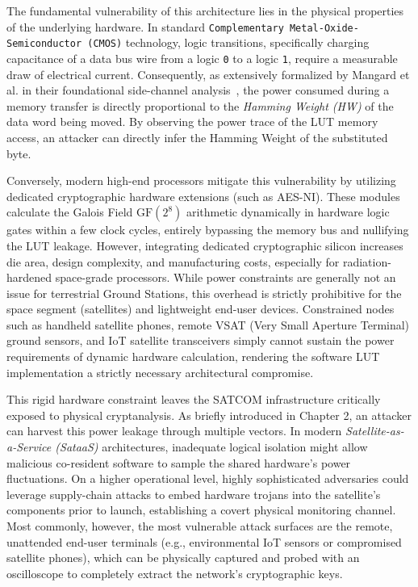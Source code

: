 \documentclass[11pt,a4paper]{report}
\begin{document}
The fundamental vulnerability of this architecture lies in the physical properties of the underlying hardware. 
In standard \texttt{Complementary Metal-Oxide-Semiconductor (CMOS)} technology, logic transitions, specifically charging capacitance of a data bus wire from a logic \texttt{0} to a logic \texttt{1}, require a measurable draw of electrical current. 
Consequently, as extensively formalized by Mangard et al. in their foundational side-channel analysis~\cite{HW_PROPOZIONALE_CONSUMO}, the power consumed during a memory transfer is directly proportional to the \textit{Hamming Weight (HW)} of the data word being moved. 
By observing the power trace of the LUT memory access, an attacker can directly infer the Hamming Weight of the substituted byte.

Conversely, modern high-end processors mitigate this vulnerability by utilizing dedicated cryptographic hardware extensions (such as AES-NI). 
These modules calculate the Galois Field $\mathrm{GF}(2^8)$ arithmetic dynamically in hardware logic gates within a few clock cycles, entirely bypassing the memory bus and nullifying the LUT leakage. 
However, integrating dedicated cryptographic silicon increases die area, design complexity, and manufacturing costs, especially for radiation-hardened space-grade processors.
While power constraints are generally not an issue for terrestrial Ground Stations, this overhead is strictly prohibitive for the space segment (satellites) and lightweight end-user devices. 
Constrained nodes such as handheld satellite phones, remote VSAT (Very Small Aperture Terminal) ground sensors, and IoT satellite transceivers simply cannot sustain the power requirements of dynamic hardware calculation, 
rendering the software LUT implementation a strictly necessary architectural compromise.

This rigid hardware constraint leaves the SATCOM infrastructure critically exposed to physical cryptanalysis. 
As briefly introduced in Chapter 2, an attacker can harvest this power leakage through multiple vectors. 
In modern \textit{Satellite-as-a-Service (SataaS)} architectures, inadequate logical isolation might allow malicious co-resident software to sample the shared hardware's power fluctuations. 
On a higher operational level, highly sophisticated adversaries could leverage supply-chain attacks to embed hardware trojans into the satellite's components prior to launch, establishing a covert physical monitoring channel. 
Most commonly, however, the most vulnerable attack surfaces are the remote, unattended end-user terminals (e.g., environmental IoT sensors or compromised satellite phones), which can be physically captured and probed with an oscilloscope to completely extract the network's cryptographic keys.
\end{document}
